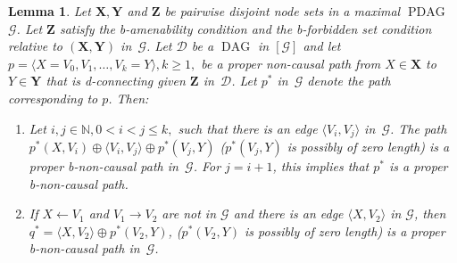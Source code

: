 \documentclass[letterpaper]{article}
\newtheorem{lemma}[theorem]{Lemma}
\theoremstyle{definition}
\theoremstyle{remark}
\DeclareMathOperator{\PDAG}{PDAG}
\DeclareMathOperator{\DAG}{DAG}
\newcommand{\bamen}{the b-amenability condition}
\newcommand{\bforb}{the b-forbidden set condition}
\newcommand{\mpdag}{maximal $\PDAG$}
\newcommand{\g}[1][G]{\mathcal{#1}}
\newcommand{\pstar}[1][p]{{#1}^{*}}
\begin{document}
\begin{lemma}
Let $\mathbf{X,Y}$ and $\mathbf{Z}$ be pairwise disjoint node sets in a \mpdag{} $\g$. Let $\mathbf{Z}$ satisfy \bamen{} and \bforb{} relative to $(\mathbf{X},\mathbf{Y})$ in~$\g$. Let $\g[D]$ be a $\DAG$ in $[\g]$ and let $p = \langle X = V_{0}, V_{1},\dots ,V_{k} = Y \rangle, k \ge 1,$ be a proper non-causal path from $X \in \mathbf{X}$ to $Y \in \mathbf{Y}$ that is d-connecting given $\mathbf{Z}$ in~$\g[D]$. Let $\pstar$ in~$\g$ denote the path corresponding to $p$. Then:
\begin{enumerate}[label=(\roman*)]
\item\label{l:ncp:pdag} Let $i,j \in \mathbb{N}, 0 < i < j \leq k,$ such that there is an edge $\langle V_i, V_j \rangle$ in~$\g$. The path $ \pstar(X,V_i) \oplus \langle V_i, V_j \rangle \oplus \pstar(V_j,Y)$ ($\pstar(V_j, Y)$ is possibly of zero length) is a proper b-non-causal path in~$\g$. For $j=i+1$, this implies that $\pstar$ is a proper b-non-causal path.
\item\label{l:ncp:b-pdag-new} If $X \leftarrow V_1$ and $V_1 \rightarrow V_2$ are not in $\g$ and there is an edge $\langle X,V_2 \rangle$ in $\g$, then $\pstar[q]=\langle X,V_2 \rangle \oplus \pstar(V_2,Y)$, ($\pstar(V_2, Y)$ is possibly of zero length) is a proper b-non-causal path in~$\g$.
\end{enumerate}
\label{lemma:non-causal-path-pdag}
\end{lemma}
\end{document}
